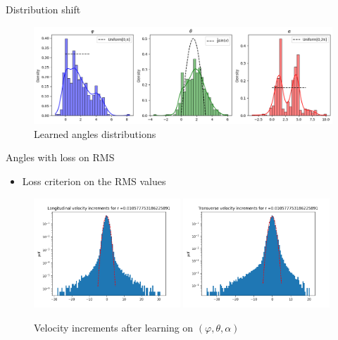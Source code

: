 \documentclass[11pt]{beamer}
\begin{document}
\begin{frame}{Distribution shift}
    \begin{figure}
        \centering
        \includegraphics[width=1\linewidth]{illustrations/AnglesDistributionLearned.png}
        \caption{Learned angles distributions}
    \end{figure}
\end{frame}

\begin{frame}{Angles with loss on RMS}
  \begin{itemize}
    \item Loss criterion on the RMS values
  \end{itemize}
  \begin{figure}
    \centering
    \includegraphics[width=0.49\textwidth]{illustrations/VelIncrAnglesRMS4.1.png}
    \includegraphics[width=0.49\textwidth]{illustrations/VelIncrAnglesRMS4.2.png}
    \caption{Velocity increments after learning on $(\varphi,\theta,\alpha)$}
  \end{figure}
\end{frame}
\end{document}
